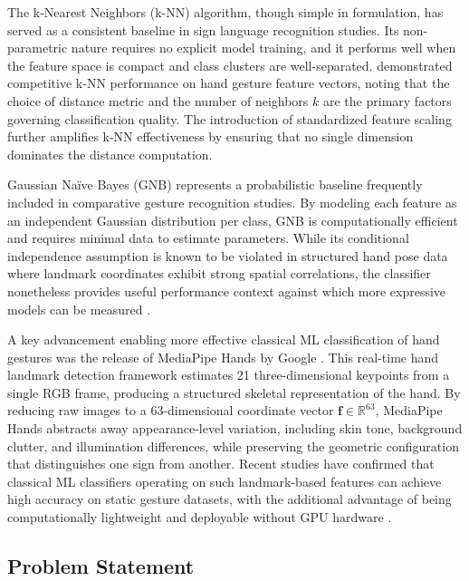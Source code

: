 \documentclass[12pt,runningheads]{llncs}
\begin{document}
The k-Nearest Neighbors (k-NN) algorithm, though simple in formulation, has served as a consistent baseline in sign language recognition studies. Its non-parametric nature requires no explicit model training, and it performs well when the feature space is compact and class clusters are well-separated. \cite{hasan2012} demonstrated competitive k-NN performance on hand gesture feature vectors, noting that the choice of distance metric and the number of neighbors $k$ are the primary factors governing classification quality. The introduction of standardized feature scaling further amplifies k-NN effectiveness by ensuring that no single dimension dominates the distance computation.

Gaussian Na\"{i}ve Bayes (GNB) represents a probabilistic baseline frequently included in comparative gesture recognition studies. By modeling each feature as an independent Gaussian distribution per class, GNB is computationally efficient and requires minimal data to estimate parameters. While its conditional independence assumption is known to be violated in structured hand pose data where landmark coordinates exhibit strong spatial correlations, the classifier nonetheless provides useful performance context against which more expressive models can be measured \cite{rish2001}.

A key advancement enabling more effective classical ML classification of hand gestures was the release of MediaPipe Hands by Google \cite{zhang2020}. This real-time hand landmark detection framework estimates 21 three-dimensional keypoints from a single RGB frame, producing a structured skeletal representation of the hand. By reducing raw images to a 63-dimensional coordinate vector $\mathbf{f} \in \mathbb{R}^{63}$, MediaPipe Hands abstracts away appearance-level variation, including skin tone, background clutter, and illumination differences, while preserving the geometric configuration that distinguishes one sign from another. Recent studies have confirmed that classical ML classifiers operating on such landmark-based features can achieve high accuracy on static gesture datasets, with the additional advantage of being computationally lightweight and deployable without GPU hardware \cite{adeyanju2021,bantupalli2018}.

\subsection{Problem Statement}
\end{document}
